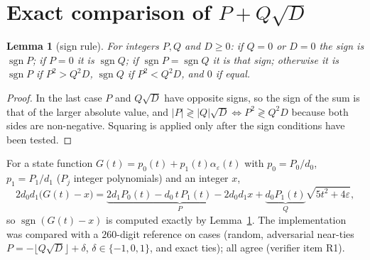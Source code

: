 \documentclass[11pt]{article}
\newtheorem{lemma}[theorem]{Lemma}
\theoremstyle{definition}
\theoremstyle{remark}
\begin{document}
\section{Exact comparison of $P+Q\sqrt D$}\label{sec:radical}
\begin{lemma}[sign rule]\label{lem:sign}
For integers $P,Q$ and $D\ge0$: if $Q=0$ or $D=0$ the sign is $\operatorname{sgn}P$; if $P=0$ it is $\operatorname{sgn}Q$; if $\operatorname{sgn}P=\operatorname{sgn}Q$ it is that sign; otherwise it is $\operatorname{sgn}P$ if $P^2>Q^2D$, $\operatorname{sgn}Q$ if $P^2<Q^2D$, and $0$ if equal.
\end{lemma}
\begin{proof}
In the last case $P$ and $Q\sqrt D$ have opposite signs, so the sign of the sum is that of the larger absolute value, and $|P|\gtrless|Q|\sqrt D\iff P^2\gtrless Q^2D$ because both sides are non-negative. Squaring is applied only after the sign conditions have been tested.
\end{proof}
For a state function $G(t)=p_0(t)+p_1(t)\alpha_\varepsilon(t)$ with $p_0=P_0/d_0$, $p_1=P_1/d_1$ ($P_j$ integer polynomials) and an integer $x$,
\[
2d_0d_1\bigl(G(t)-x\bigr)=\underbrace{2d_1P_0(t)-d_0\,t\,P_1(t)-2d_0d_1x}_{P}+\underbrace{d_0P_1(t)}_{Q}\sqrt{5t^2+4\varepsilon},
\]
so $\operatorname{sgn}(G(t)-x)$ is computed exactly by Lemma~\ref{lem:sign}. The implementation was compared with a $260$-digit reference on \NRad{} cases (random, adversarial near-ties $P=-\lfloor Q\sqrt D\rfloor+\delta$, $\delta\in\{-1,0,1\}$, and exact ties); all agree (verifier item R1).
\end{document}
